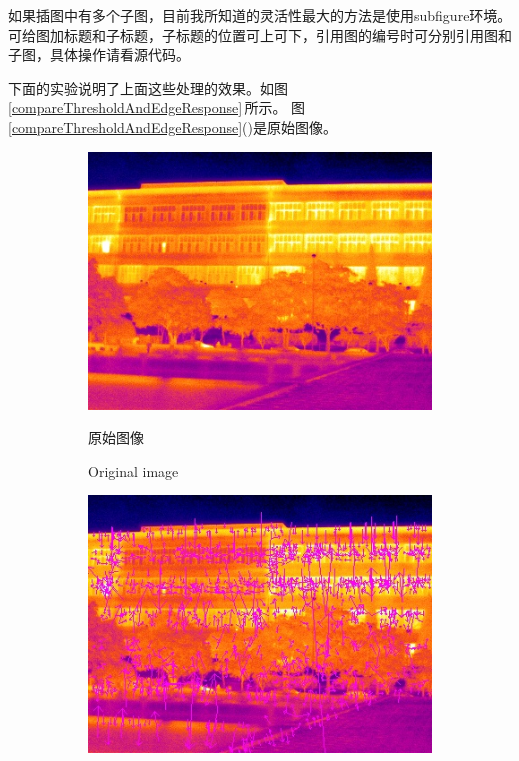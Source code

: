 \documentclass[10.5pt,a4paper]{article}
\numberwithin{equation}{section}
\numberwithin{figure}{section}
\numberwithin{table}{section}
\begin{document}
\par
如果插图中有多个子图，目前我所知道的灵活性最大的方法是使用subfigure环境。
可给图加标题和子标题，子标题的位置可上可下，引用图的编号时可分别引用图和子图，具体操作请看源代码。
\par
下面的实验说明了上面这些处理的效果。如图\,\ref{compareThresholdAndEdgeResponse}\,所示。
图\ref{compareThresholdAndEdgeResponse}()是原始图像。
\begin{figure}[htbp]
\centering
	\begin{subfigure}[b]{.4\textwidth}
		\centering
				\includegraphics[width=\textwidth]{pictures/compareEdgeResponse/12.jpg}
				\caption{原始图像\label{originalZhulou}}
				\addtocounter{subfigure}{-1}
				\caption{Original image}
	\end{subfigure}
	\qquad
	\begin{subfigure}[b]{.4\textwidth}
		\centering
				\includegraphics[width=\textwidth]{pictures/compareEdgeResponse/siftFeature1301.jpg}

\end{subfigure}
\end{figure}
\end{document}
